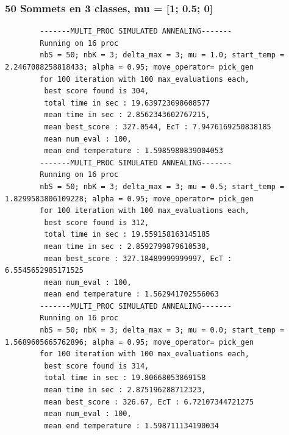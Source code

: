 \documentclass[a4paper]{article}
\begin{document}
		\subsubsection{50 Sommets en 3 classes, mu = [1; 0.5; 0]}
		\begin{verbatim}
		-------MULTI_PROC SIMULATED ANNEALING-------
		Running on 16 proc
		nbS = 50; nbK = 3; delta_max = 3; mu = 1.0; start_temp = 2.2467088258818433; alpha = 0.95; move_operator= pick_gen
		for 100 iteration with 100 max_evaluations each, 
		 best score found is 304,
		 total time in sec : 19.639723698608577
		 mean time in sec : 2.8562343602767215,
		 mean best_score : 327.0544, EcT : 7.9476169250838185
		 mean num_eval : 100,
		 mean end temperature : 1.5985980839004053
		-------MULTI_PROC SIMULATED ANNEALING-------
		Running on 16 proc
		nbS = 50; nbK = 3; delta_max = 3; mu = 0.5; start_temp = 1.8299583806109228; alpha = 0.95; move_operator= pick_gen
		for 100 iteration with 100 max_evaluations each, 
		 best score found is 312,
		 total time in sec : 19.559158163145185
		 mean time in sec : 2.8592799879610538,
		 mean best_score : 327.18489999999997, EcT : 6.5545652985171525
		 mean num_eval : 100,
		 mean end temperature : 1.562941702556063
		-------MULTI_PROC SIMULATED ANNEALING-------
		Running on 16 proc
		nbS = 50; nbK = 3; delta_max = 3; mu = 0.0; start_temp = 1.5689605665762896; alpha = 0.95; move_operator= pick_gen
		for 100 iteration with 100 max_evaluations each, 
		 best score found is 314,
		 total time in sec : 19.80668053869158
		 mean time in sec : 2.875196288712323,
		 mean best_score : 326.67, EcT : 6.72107344721275
		 mean num_eval : 100,
		 mean end temperature : 1.598711134190034
		\end{verbatim}
\end{document}
